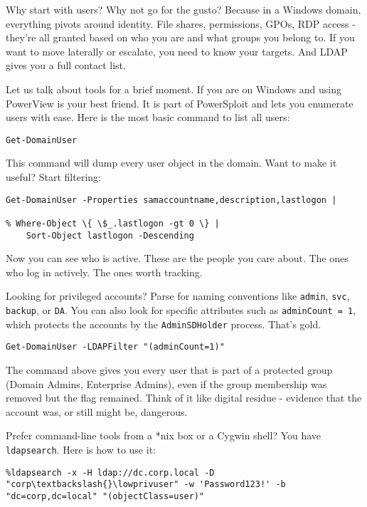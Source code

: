 Why start with users? Why not go for the gusto? Because in a Windows domain, everything pivots around identity. File shares, permissions, GPOs, RDP access - they’re all granted based on who you are and what groups you belong to. If you want to move laterally or escalate, you need to know your targets. And LDAP gives you a full contact list.

Let us talk about tools for a brief moment. If you are on Windows and using PowerView is your best friend. It is part of PowerSploit and lets you enumerate users with ease. Here is the most basic command to list all users:

\begin{verbatim}
Get-DomainUser
\end{verbatim}

This command will dump every user object in the domain. Want to make it useful? Start filtering:

\begin{verbatim}
Get-DomainUser -Properties samaccountname,description,lastlogon |

% Where-Object \{ \$_.lastlogon -gt 0 \} |
    Sort-Object lastlogon -Descending
\end{verbatim}

Now you can see who is active. These are the people you care about. The ones who log in actively. The ones worth tracking.

Looking for privileged accounts? Parse for naming conventions like \texttt{admin}, \texttt{svc}, \texttt{backup}, or \texttt{DA}. You can also look for specific attributes such as \texttt{adminCount = 1}, which protects the accounts by the \texttt{AdminSDHolder} process. That’s gold.

\begin{verbatim}
Get-DomainUser -LDAPFilter "(adminCount=1)"
\end{verbatim}

The command above gives you every user that is part of a protected group (Domain Admins, Enterprise Admins), even if the group membership was removed but the flag remained. Think of it like digital residue - evidence that the account was, or still might be, dangerous.

Prefer command-line tools from a *nix box or a Cygwin shell? You have \texttt{ ldapsearch}. Here is how to use it:

\begin{verbatim}
%ldapsearch -x -H ldap://dc.corp.local -D "corp\textbackslash{}\lowprivuser" -w 'Password123!' -b "dc=corp,dc=local" "(objectClass=user)"
\end{verbatim}

